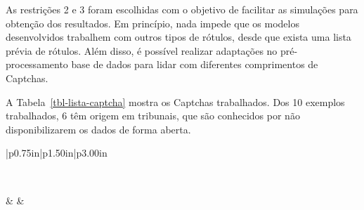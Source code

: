 \documentclass[12pt,twoside,brazilian]{book}
\begin{document}
As restrições 2 e 3 foram escolhidas com o objetivo de facilitar as
simulações para obtenção dos resultados. Em princípio, nada impede que
os modelos desenvolvidos trabalhem com outros tipos de rótulos, desde
que exista uma lista prévia de rótulos. Além disso, é possível realizar
adaptações no pré-processamento base de dados para lidar com diferentes
comprimentos de Captchas.

A Tabela~\ref{tbl-lista-captcha} mostra os Captchas trabalhados. Dos 10
exemplos trabalhados, 6 têm origem em tribunais, que são conhecidos por
não disponibilizarem os dados de forma aberta.

\hypertarget{tbl-lista-captcha}{}
\begin{table}[H]

\providecommand{\docline}[3]{\noalign{\global\setlength{\arrayrulewidth}{#1}}\arrayrulecolor[HTML]{#2}\cline{#3}}

\setlength{\tabcolsep}{0pt}

\renewcommand*{\arraystretch}{1.5}

\begin{longtable}[c]{|p{0.75in}|p{1.50in}|p{3.00in}}

\caption{\label{tbl-lista-captcha}Lista de captchas analisados. } \\ 



 &  &  \\

\endhead




\end{longtable}
\end{table}
\end{document}
